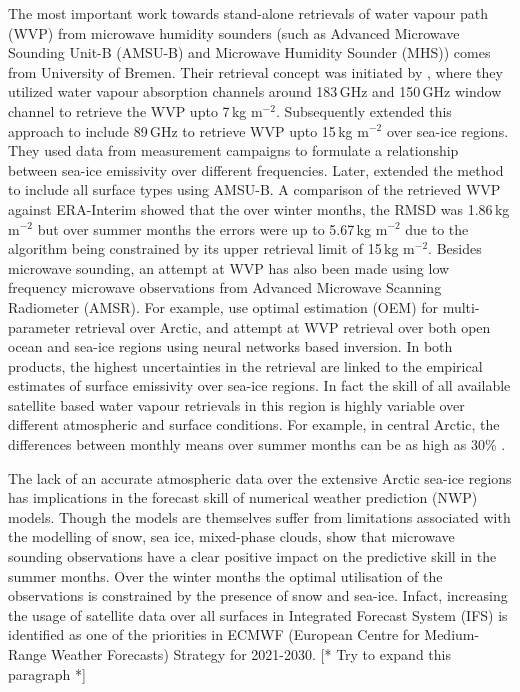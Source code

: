\documentclass[12pt,oneside,a4paper]{article}
\newcommand\intodo[1]{{\color{red} [* #1 *]}}
\begin{document}
The most important work towards stand-alone retrievals of water vapour path (WVP) from microwave humidity sounders (such as Advanced Microwave
Sounding Unit-B (AMSU-B) and Microwave Humidity Sounder (MHS)) comes from
University of Bremen. Their retrieval concept was initiated by
\citet{miao:2001:atmos}, where they utilized water vapour absorption channels
around 183\,GHz and 150\,GHz window channel to retrieve the WVP upto 7\,kg m$^{-2}$. Subsequently \citet{melsheimer:2008:impro} extended this approach to include 89\,GHz to retrieve WVP upto 15\,kg m$^{-2}$ over sea-ice regions. They used data from measurement campaigns to formulate a relationship between sea-ice emissivity over different frequencies. Later,
\citet{scarlat:2018:retri} extended the method to include all surface types
using AMSU-B. A comparison of the retrieved WVP against ERA-Interim showed that the over winter months, the RMSD was 1.86\,kg m$^{-2}$ but over summer months the errors were up to 5.67\,kg m$^{-2}$ due to the algorithm being constrained by its upper retrieval limit of 15\,kg m$^{-2}$. Besides microwave sounding, an attempt at WVP has also been made using low frequency microwave observations from Advanced Microwave Scanning Radiometer (AMSR). For example, \citet{scarlat:2017:exper} use optimal estimation (OEM) for multi-parameter retrieval over Arctic, and \citet{zabolotskikh:2020:anadv} attempt at WVP retrieval over both open ocean and sea-ice regions using neural networks based inversion. In both products, the highest uncertainties in the retrieval are linked to the empirical estimates of surface emissivity over sea-ice regions. In fact the skill of all available satellite based water vapour retrievals in this region is highly variable over different atmospheric and surface conditions. For example, in central Arctic, the differences between monthly means over summer months can be as high as 30\% \citep{crewell:2021:asyst}.

The lack of an accurate atmospheric data over the extensive Arctic sea-ice
regions has implications in the forecast skill of numerical weather prediction (NWP) models. Though the models are themselves suffer from limitations associated with the modelling of snow, sea ice, mixed-phase clouds, \citet{lawrence:2019:usean} show that microwave sounding observations have a clear positive impact on the predictive skill in the summer months. Over the winter months the optimal utilisation of the observations is constrained by the presence of snow and sea-ice. Infact, increasing the usage of satellite data over all surfaces in Integrated Forecast System (IFS) is identified as one of the priorities in ECMWF (European Centre for Medium-Range Weather Forecasts) Strategy for 2021-2030. \intodo{Try to expand this paragraph}
\end{document}
